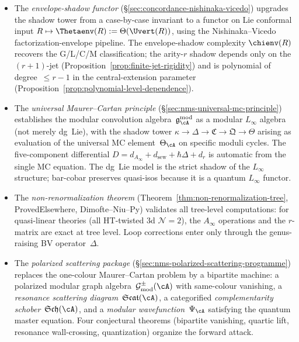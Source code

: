 \begin{itemize}
  The Virasoro quartic contact coefficient
  $Q^{\mathrm{contact}}_{\mathrm{Vir}} = 10/[c(5c+22)]$
  and the genus-$1$ loop ratio
  $\rho^{(1)}_{\mathrm{Vir}} = 240/[c^2(5c+22)]$ are the first
  non-scalar Ring~2 invariants extracted in closed form.
\item The \emph{envelope-shadow functor}
  (\S\ref{sec:concordance-nishinaka-vicedo}) upgrades the shadow
  tower from a case-by-case invariant to a functor on Lie conformal
  input $R \mapsto \Thetaenv(R) := \Theta(\Uvert(R))$, using the
  Nishinaka--Vicedo factorization-envelope pipeline.  The
  envelope-shadow complexity $\chienv(R)$ recovers the
  G/L/C/M classification; the arity-$r$ shadow depends only on
  the $(r{+}1)$-jet (Proposition~\ref{prop:finite-jet-rigidity})
  and is polynomial of degree~$\leq r{-}1$ in the
  central-extension parameter
  (Proposition~\ref{prop:polynomial-level-dependence}).
\item The \emph{universal Maurer--Cartan principle}
  (\S\ref{sec:nms-universal-mc-principle}) establishes the modular
  convolution algebra~$\mathfrak{g}_\cA^{\mathrm{mod}}$ as a modular
  $L_\infty$ algebra (not merely dg~Lie), with the shadow tower
  $\kappa \to \Delta \to \mathfrak{C} \to \mathfrak{Q} \to \Theta$
  arising as evaluation of the universal MC element~$\Theta_\cA$
  on specific moduli cycles.  The five-component differential
  $D = d_{A_\infty} + d_{\mathrm{sew}} + \hbar\Delta + d_r$
  is automatic from the single MC equation.  The dg~Lie model
  is the strict shadow of the $L_\infty$ structure; bar-cobar
  preserves quasi-isos because it is a quantum $L_\infty$ functor.
\item The \emph{non-renormalization theorem}
  (Theorem~\ref{thm:non-renormalization-tree}, ProvedElsewhere,
  Dimofte--Niu--Py) validates all tree-level computations: for
  quasi-linear theories (all HT-twisted 3d $\mathcal{N}=2$), the
  $A_\infty$ operations and the $r$-matrix are exact at tree level.
  Loop corrections enter only through the genus-raising BV
  operator~$\Delta$.
\item The \emph{polarized scattering package}
  (\S\ref{sec:nms-polarized-scattering-programme}) replaces the
  one-colour Maurer--Cartan problem by a bipartite machine:
  a polarized modular graph
  algebra~$\mathcal{G}^{\pm}_{\mathrm{mod}}(\cA)$ with
  same-colour vanishing, a \emph{resonance scattering
  diagram}~$\mathfrak{Scat}(\cA)$, a categorified
  \emph{complementarity schober}~$\mathfrak{Sch}(\cA)$, and a
  \emph{modular wavefunction}~$\Psi_\cA$ satisfying the quantum
  master equation.  Four conjectural theorems (bipartite
  vanishing, quartic lift, resonance wall-crossing, quantization)
  organize the forward attack.
\end{itemize}

